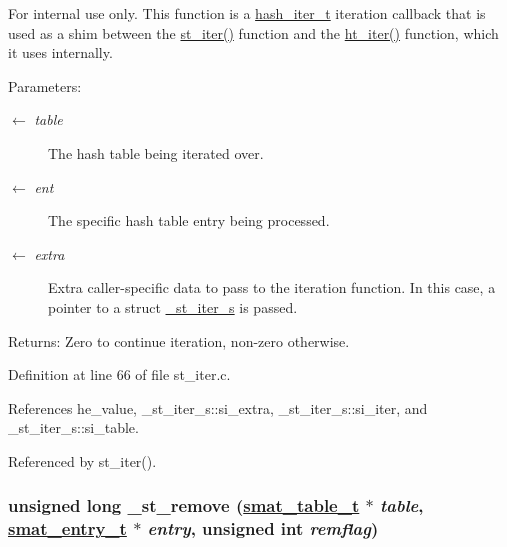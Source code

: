 \begin{Desc}
\item[For internal use only.]
This function is a \hyperlink{group__dbprim__hash_ga3}{hash\_\-iter\_\-t} iteration callback that is used as a shim between the \hyperlink{group__dbprim__smat_ga14}{st\_\-iter()} function and the \hyperlink{group__dbprim__hash_ga15}{ht\_\-iter()} function, which it uses internally.

\begin{Desc}
\item[Parameters:]
\begin{description}
\item[\mbox{$\leftarrow$} {\em table}]The hash table being iterated over. \item[\mbox{$\leftarrow$} {\em ent}]The specific hash table entry being processed. \item[\mbox{$\leftarrow$} {\em extra}]Extra caller-specific data to pass to the iteration function. In this case, a pointer to a struct \hyperlink{struct__st__iter__s}{\_\-st\_\-iter\_\-s} is passed.\end{description}
\end{Desc}
\begin{Desc}
\item[Returns:]Zero to continue iteration, non-zero otherwise.\end{Desc}
\end{Desc}


Definition at line 66 of file st\_\-iter.c.

References he\_\-value, \_\-st\_\-iter\_\-s::si\_\-extra, \_\-st\_\-iter\_\-s::si\_\-iter, and \_\-st\_\-iter\_\-s::si\_\-table.

Referenced by st\_\-iter().\hypertarget{group__dbprim__smat_ga23}{
\subsubsection[\_\-st\_\-remove]{\setlength{\rightskip}{0pt plus 5cm}unsigned long \_\-st\_\-remove (\hyperlink{struct__smat__table__s}{smat\_\-table\_\-t} $\ast$ {\em table}, \hyperlink{struct__smat__entry__s}{smat\_\-entry\_\-t} $\ast$ {\em entry}, unsigned int {\em remflag})}}
\label{group__dbprim__smat_ga23}


